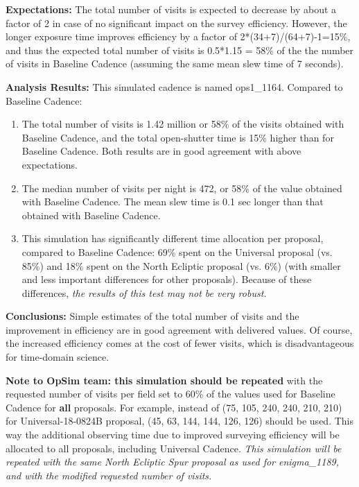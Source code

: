 \documentclass[manuscript]{article}
\begin{document}
{\bf Expectations:} The total number of visits is expected to decrease by about a factor of 2
in case of no significant impact on the survey efficiency. However, the longer exposure time
improves efficiency by a factor of 2*(34+7)/(64+7)-1=15\%, and thus the expected total 
number of visits is 0.5*1.15 = 58\% of the the number of visits in Baseline Cadence (assuming 
the same mean slew time of 7 seconds). 

{\bf Analysis Results:} This simulated cadence is named ops1\_1164.  
Compared to Baseline Cadence: 
\begin{enumerate}
\item The total number of visits is 1.42 million or 58\% of the visits obtained with
Baseline Cadence, and the total open-shutter time is 15\% higher than for Baseline 
Cadence. Both results are in good agreement with above expectations. 
\item The median number of visits per night is 472, or 58\% of the value obtained with
Baseline Cadence. The mean slew time is 0.1 sec longer than that obtained with Baseline 
Cadence. 
\item This simulation has significantly different time allocation per proposal, compared
to Baseline Cadence: 69\% spent on the Universal proposal (vs. 85\%) and 18\%  spent
on the North Ecliptic proposal (vs. 6\%)  (with smaller and less important differences for other 
proposals). Because of these differences, {\it the results of this test may not be very robust.}
\end{enumerate}

{\bf Conclusions:} 
Simple estimates of the total number of visits and the improvement in efficiency are 
in good agreement with delivered values. Of course, the increased efficiency comes at the 
cost of fewer visits, which is disadvantageous for time-domain science.  

{\bf Note to OpSim team: this simulation should be repeated} with the requested number of visits
per field set to 60\% of the values used for Baseline Cadence for {\bf all} proposals.
For example, instead of (75, 105, 240, 240, 210, 210) for Universal-18-0824B proposal,
(45, 63, 144, 144, 126, 126) should be used.  This way the additional observing time due to 
improved surveying efficiency will be allocated to all proposals, including Universal Cadence. 
 {\it This simulation will be repeated with the same North Ecliptic Spur proposal as used for 
enigma\_1189, and with the modified requested number of visits.}
\end{document}

